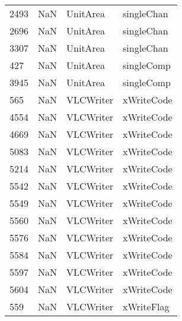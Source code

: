\begin{tabular}{llll}
2493 &                   NaN &                   UnitArea &                                singleChan \\
2696 &                   NaN &                   UnitArea &                                singleChan \\
3307 &                   NaN &                   UnitArea &                                singleChan \\
427  &                   NaN &                   UnitArea &                                singleComp \\
3945 &                   NaN &                   UnitArea &                                singleComp \\
565  &                   NaN &                  VLCWriter &                                xWriteCode \\
4554 &                   NaN &                  VLCWriter &                                xWriteCode \\
4669 &                   NaN &                  VLCWriter &                                xWriteCode \\
5083 &                   NaN &                  VLCWriter &                                xWriteCode \\
5214 &                   NaN &                  VLCWriter &                                xWriteCode \\
5542 &                   NaN &                  VLCWriter &                                xWriteCode \\
5549 &                   NaN &                  VLCWriter &                                xWriteCode \\
5560 &                   NaN &                  VLCWriter &                                xWriteCode \\
5576 &                   NaN &                  VLCWriter &                                xWriteCode \\
5584 &                   NaN &                  VLCWriter &                                xWriteCode \\
5597 &                   NaN &                  VLCWriter &                                xWriteCode \\
5604 &                   NaN &                  VLCWriter &                                xWriteCode \\
559  &                   NaN &                  VLCWriter &                                xWriteFlag \\

\end{tabular}
